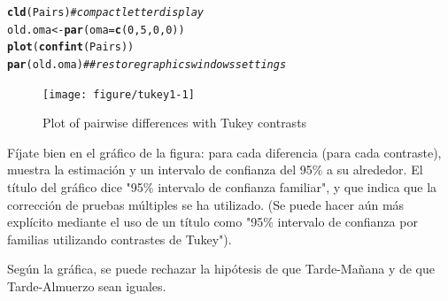 \documentclass{config/apuntes}\usepackage[]{graphicx}\usepackage[]{xcolor}
\makeatletter
\newcommand{\hlnum}[1]{\textcolor[rgb]{0.686,0.059,0.569}{#1}}%
\newcommand{\hlcom}[1]{\textcolor[rgb]{0.678,0.584,0.686}{\textit{#1}}}%
\newcommand{\hldef}[1]{\textcolor[rgb]{0.345,0.345,0.345}{#1}}%
\newcommand{\hlkwb}[1]{\textcolor[rgb]{0.69,0.353,0.396}{#1}}%
\newcommand{\hlkwc}[1]{\textcolor[rgb]{0.333,0.667,0.333}{#1}}%
\newcommand{\hlkwd}[1]{\textcolor[rgb]{0.737,0.353,0.396}{\textbf{#1}}}%
\newenvironment{kframe}{%
 \def\at@end@of@kframe{}%
 \ifinner\ifhmode%
  \def\at@end@of@kframe{\end{minipage}}%
  \begin{minipage}{\columnwidth}%
 \fi\fi%
 \def\FrameCommand##1{\hskip\@totalleftmargin \hskip-\fboxsep
 \colorbox{shadecolor}{##1}\hskip-\fboxsep
     \hskip-\linewidth \hskip-\@totalleftmargin \hskip\columnwidth}%
 \MakeFramed {\advance\hsize-\width
   \@totalleftmargin\z@ \linewidth\hsize
   \@setminipage}}%
 {\par\unskip\endMakeFramed%
 \at@end@of@kframe}
\newenvironment{knitrout}{}{} %
\makeatother
\begin{document}
\begin{knitrout}
\color{fgcolor}\begin{kframe}
\begin{alltt}
\hlkwd{cld}\hldef{(Pairs)} \hlcom{# compact letter display}
\hldef{old.oma} \hlkwb{<-} \hlkwd{par}\hldef{(}\hlkwc{oma} \hldef{=} \hlkwd{c}\hldef{(}\hlnum{0}\hldef{,}\hlnum{5}\hldef{,}\hlnum{0}\hldef{,}\hlnum{0}\hldef{))}
\hlkwd{plot}\hldef{(}\hlkwd{confint}\hldef{(Pairs))}
\hlkwd{par}\hldef{(old.oma)} \hlcom{## restore graphics windows settings}
\end{alltt}
\end{kframe}\begin{figure}
\texttt{[image: figure/tukey1-1]} \caption[Plot of pairwise differences with Tukey contrasts]{Plot of pairwise differences with Tukey contrasts}\label{fig:tukey1}
\end{figure}

\end{knitrout}

Fíjate bien en el gráfico de la figura: para cada diferencia (para cada contraste), muestra la estimación y un intervalo de confianza del 95\% a su alrededor. El título del gráfico dice "95\% intervalo de confianza familiar", y que indica que la corrección de pruebas múltiples se ha utilizado. (Se puede hacer aún más explícito mediante el uso de un título como "95\% intervalo de confianza por familias utilizando contrastes de Tukey").

Según la gráfica, se puede rechazar la hipótesis de que Tarde-Mañana y de que Tarde-Almuerzo sean iguales. 
\end{document}
